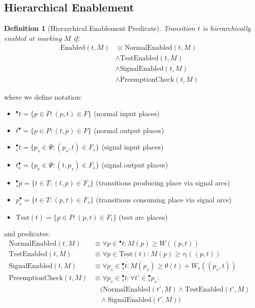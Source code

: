 \documentclass[10pt,letterpaper]{article}
\newtheorem{definition}{Definition}
\begin{document}
\subsection{Hierarchical Enablement}

\begin{definition}[Hierarchical Enablement Predicate]
Transition $t$ is hierarchically enabled at marking $M$ if:
\begin{align}
\text{Enabled}(t, M) &\equiv \text{NormalEnabled}(t,M) \nonumber \\
&\wedge \text{TestEnabled}(t,M) \nonumber \\
&\wedge \text{SignalEnabled}(t,M) \nonumber \\
&\wedge \text{PreemptionCheck}(t,M)
\end{align}
\end{definition}

where we define notation:
\begin{itemize}
\item ${}^\bullet t = \{p \in P : (p,t) \in F\}$ (normal input places)
\item $t^\bullet = \{p \in P : (t,p) \in F\}$ (normal output places)
\item ${}^\bullet_s t = \{p_s \in \Psi : (p_s,t) \in F_s\}$ (signal input places)
\item $t^\bullet_s = \{p_s \in \Psi : (t,p_s) \in F_s\}$ (signal output places)
\item ${}^\bullet_s p = \{t \in T : (t,p) \in F_s\}$ (transitions producing place via signal arcs)
\item $p^\bullet_s = \{t \in T : (p,t) \in F_s\}$ (transitions consuming place via signal arcs)
\item $\text{Test}(t) = \{p \in P : (p,t) \in F_t\}$ (test arc places)
\end{itemize}

and predicates:
\begin{align}
\text{NormalEnabled}(t,M) &\equiv \forall p \in {}^\bullet t: M(p) \geq W((p,t)) \\
\text{TestEnabled}(t,M) &\equiv \forall p \in \text{Test}(t): M(p) \geq \tau_t((p,t)) \\
\text{SignalEnabled}(t,M) &\equiv \forall p_s \in {}^\bullet_s t: M(p_s) \geq \theta(t) + W_s((p_s,t)) \\
\text{PreemptionCheck}(t,M) &\equiv \forall p_s \in {}^\bullet_s t: \forall t' \in {}^{\bullet}_s p_s: \nonumber \\
&\quad (\text{NormalEnabled}(t',M) \wedge \text{TestEnabled}(t',M) \nonumber \\
&\quad \wedge \text{SignalEnabled}(t',M))
\end{align}
\end{document}
